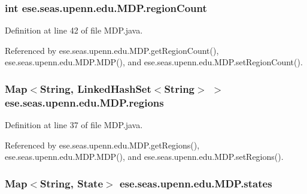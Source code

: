 \subsubsection[{region\+Count}]{\setlength{\rightskip}{0pt plus 5cm}int ese.\+seas.\+upenn.\+edu.\+M\+D\+P.\+region\+Count\hspace{0.3cm}{\ttfamily [private]}}\label{classese_1_1seas_1_1upenn_1_1edu_1_1_m_d_p_ab06e750b3f8875deaacb13a575fcde5e}


Definition at line 42 of file M\+D\+P.\+java.



Referenced by ese.\+seas.\+upenn.\+edu.\+M\+D\+P.\+get\+Region\+Count(), ese.\+seas.\+upenn.\+edu.\+M\+D\+P.\+M\+D\+P(), and ese.\+seas.\+upenn.\+edu.\+M\+D\+P.\+set\+Region\+Count().

\hypertarget{classese_1_1seas_1_1upenn_1_1edu_1_1_m_d_p_a168a72d2ae768cb6a747e3124e008ed1}{}
\subsubsection[{regions}]{\setlength{\rightskip}{0pt plus 5cm}Map$<$String, Linked\+Hash\+Set$<$String$>$ $>$ ese.\+seas.\+upenn.\+edu.\+M\+D\+P.\+regions\hspace{0.3cm}{\ttfamily [private]}}\label{classese_1_1seas_1_1upenn_1_1edu_1_1_m_d_p_a168a72d2ae768cb6a747e3124e008ed1}


Definition at line 37 of file M\+D\+P.\+java.



Referenced by ese.\+seas.\+upenn.\+edu.\+M\+D\+P.\+get\+Regions(), ese.\+seas.\+upenn.\+edu.\+M\+D\+P.\+M\+D\+P(), and ese.\+seas.\+upenn.\+edu.\+M\+D\+P.\+set\+Regions().

\hypertarget{classese_1_1seas_1_1upenn_1_1edu_1_1_m_d_p_a6d9956c1180bfa49e36daf7a9348ee49}{}
\subsubsection[{states}]{\setlength{\rightskip}{0pt plus 5cm}Map$<$String, {\bf State}$>$ ese.\+seas.\+upenn.\+edu.\+M\+D\+P.\+states\hspace{0.3cm}{\ttfamily [private]}}\label{classese_1_1seas_1_1upenn_1_1edu_1_1_m_d_p_a6d9956c1180bfa49e36daf7a9348ee49}


